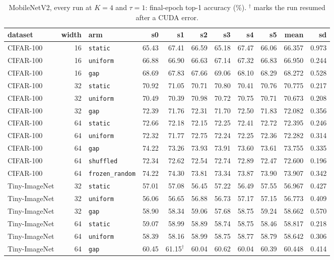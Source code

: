 \documentclass[10pt,a4paper]{article}
\begin{document}
\begin{table}[h]\centering\scriptsize
\caption{MobileNetV2, every run at $K=4$ and $\tau=1$: final-epoch top-1
accuracy (\si{\percent}). $^\dagger$ marks the run resumed after a CUDA
error.}
\label{tab:mballruns}
\begin{tabular}{l r l rrrrrr rr}
\toprule
dataset & width & arm & s0 & s1 & s2 & s3 & s4 & s5 & mean & sd \\
\midrule
CIFAR-100 & 16 & \texttt{static} & 65.43 & 67.41 & 66.59 & 65.18 & 67.47 & 66.06 & 66.357 & 0.973 \\
CIFAR-100 & 16 & \texttt{uniform} & 66.88 & 66.90 & 66.63 & 67.14 & 67.32 & 66.83 & 66.950 & 0.244 \\
CIFAR-100 & 16 & \texttt{gap} & 68.69 & 67.83 & 67.66 & 69.06 & 68.10 & 68.29 & 68.272 & 0.528 \\
CIFAR-100 & 32 & \texttt{static} & 70.92 & 71.05 & 70.71 & 70.80 & 70.41 & 70.76 & 70.775 & 0.217 \\
CIFAR-100 & 32 & \texttt{uniform} & 70.49 & 70.39 & 70.98 & 70.72 & 70.75 & 70.71 & 70.673 & 0.208 \\
CIFAR-100 & 32 & \texttt{gap} & 72.39 & 71.76 & 72.31 & 71.70 & 72.50 & 71.83 & 72.082 & 0.356 \\
CIFAR-100 & 64 & \texttt{static} & 72.66 & 72.18 & 72.15 & 72.25 & 72.41 & 72.72 & 72.395 & 0.246 \\
CIFAR-100 & 64 & \texttt{uniform} & 72.32 & 71.77 & 72.75 & 72.24 & 72.25 & 72.36 & 72.282 & 0.314 \\
CIFAR-100 & 64 & \texttt{gap} & 74.22 & 73.26 & 73.93 & 73.91 & 73.60 & 73.61 & 73.755 & 0.335 \\
CIFAR-100 & 64 & \texttt{shuffled} & 72.34 & 72.62 & 72.54 & 72.74 & 72.89 & 72.47 & 72.600 & 0.196 \\
CIFAR-100 & 64 & \texttt{frozen\_random} & 74.22 & 74.30 & 73.81 & 73.34 & 73.87 & 73.90 & 73.907 & 0.342 \\
Tiny-ImageNet & 32 & \texttt{static} & 57.01 & 57.08 & 56.45 & 57.22 & 56.49 & 57.55 & 56.967 & 0.427 \\
Tiny-ImageNet & 32 & \texttt{uniform} & 56.06 & 56.65 & 56.88 & 56.73 & 57.17 & 57.15 & 56.773 & 0.409 \\
Tiny-ImageNet & 32 & \texttt{gap} & 58.90 & 58.34 & 59.06 & 57.68 & 58.75 & 59.24 & 58.662 & 0.570 \\
Tiny-ImageNet & 64 & \texttt{static} & 59.07 & 58.99 & 58.89 & 58.74 & 58.75 & 58.46 & 58.817 & 0.218 \\
Tiny-ImageNet & 64 & \texttt{uniform} & 58.39 & 58.16 & 58.99 & 58.75 & 58.77 & 58.79 & 58.642 & 0.306 \\
Tiny-ImageNet & 64 & \texttt{gap} & 60.45 & 61.15$^\dagger$ & 60.04 & 60.62 & 60.04 & 60.39 & 60.448 & 0.414 \\
\bottomrule
\end{tabular}
\end{table}
\end{document}
